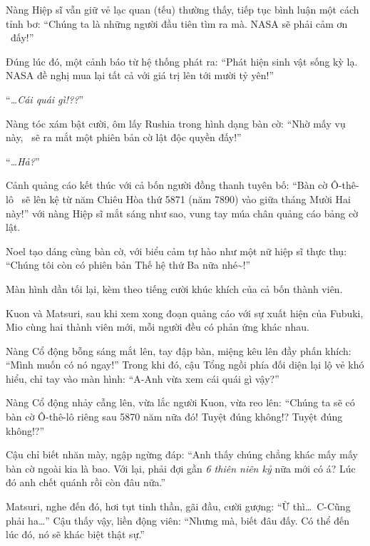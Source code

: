 \documentclass[../main.tex]{subfiles}
\begin{document}
Nàng Hiệp sĩ vẫn giữ vẻ lạc quan (tếu) thường thấy, tiếp tục bình luận một cách tỉnh bơ: ``Chúng ta là những người đầu tiên tìm ra mà. NASA sẽ phải cảm ơn \hll\ đấy!''

Đúng lúc đó, một cảnh báo từ hệ thống phát ra: ``Phát hiện sinh vật sống kỳ lạ. NASA đề nghị mua lại tất cả với giá trị lên tới mười tỷ yên!''

``\textit{\dots Cái quái gì!??}''

Nàng tóc xám bật cười, ôm lấy Rushia trong hình dạng bàn cờ: ``Nhờ mấy vụ này, \hll\ sẽ ra mắt một phiên bản cờ lật độc quyền đấy!''

``\textit{\dots Hả?}''


Cảnh quảng cáo kết thúc với cả bốn người đồng thanh tuyên bố: ``Bàn cờ Ô-thê-lô \hll\ sẽ lên kệ từ năm Chiêu Hòa thứ 5871 (năm 7890) vào giữa tháng Mười Hai này!'' với nàng Hiệp sĩ mắt sáng như sao, vung tay múa chân quảng cáo bảng cờ lật.

Noel tạo dáng cùng bàn cờ, với biểu cảm tự hào như một nữ hiệp sĩ thực thụ: ``Chúng tôi còn có phiên bản Thế hệ thứ Ba nữa nhé\~{}!''

Màn hình dần tối lại, kèm theo tiếng cười khúc khích của cả bốn thành viên.

\omk

Kuon và Matsuri, sau khi xem xong đoạn quảng cáo với sự xuất hiện của Fubuki, Mio cùng hai thành viên mới, mỗi người đều có phản ứng khác nhau.

Nàng Cổ động bỗng sáng mắt lên, tay đập bàn, miệng kêu lên đầy phấn khích: ``Mình muốn có nó ngay!'' Trong khi đó, cậu Tổng ngồi phía đối diện lại lộ vẻ khó hiểu, chỉ tay vào màn hình: ``A-Anh vừa xem cái quái gì vậy?''

Nàng Cổ động nhảy cẫng lên, vừa lắc người Kuon, vừa reo lên: ``Chúng ta sẽ có bàn cờ Ô-thê-lô riêng sau 5870 năm nữa đó! Tuyệt đúng không!? Tuyệt đúng không!?''

Cậu chỉ biết nhăn mày, ngập ngừng đáp: ``Anh thấy chúng chẳng khác mấy mấy bàn cờ ngoài kia là bao. Với lại, phải đợi gần \emph{6 thiên niên kỷ} nữa mới có á? Lúc đó anh chết quánh rồi còn đâu nữa.''

Matsuri, nghe đến đó, hơi tụt tinh thần, gãi đầu, cười gượng: ``Ừ thì\dots\ C-Cũng phải ha\dots'' Cậu thấy vậy, liền động viên: ``Nhưng mà, biết đâu đấy. Có thể đến lúc đó, nó sẽ khác biệt thật sự.''
\end{document}
